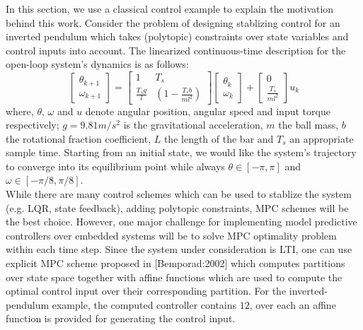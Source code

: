 In this section, we use a classical control example to explain the motivation behind this work. Consider the problem of designing stablizing control for an inverted pendulum which takes (polytopic) constraints over state variables and control inputs into account. The linearized continuous-time description for the open-loop system's dynamics is as follows:
	\begin{equation}
		\begin{bmatrix}
			 \theta_{k+1}\\
			\omega_{k+1}
		\end{bmatrix}=
		\begin{bmatrix}
			1 & T_s\\
			\frac{T_sg}{l}& (1-\frac{T_sb}{ml^2})		
		\end{bmatrix}
		\begin{bmatrix}
			\theta_k\\
			\omega_k
		\end{bmatrix}+
		\begin{bmatrix}
			0\\
			\frac{T_s}{ml^2}
		\end{bmatrix}u_k
		\label{eq:pendul_ss}
	\end{equation}
	where, $\theta$, $\omega$ and $u$ denote angular position, angular speed and input torque respectively; $g=9.81 m/s^2$ is the gravitational acceleration, $m$ the ball mass, $b$ the rotational fraction coefficient, $L$ the length of the bar and $T_s$ an appropriate sample time. Starting from an initial state, we would like the system's trajectory to converge into its equilibrium point while always $\theta\in[-\pi,\pi]$ and $\omega\in[-\pi/8,\pi/8]$. \\
	While there are many control schemes which can be used to stablize the system (e.g. LQR, state feedback), adding polytopic constraints, MPC schemes will be the best choice. 
	However, one major challenge for implementing model predictive controllers over embedded systems will be to solve MPC optimality problem within each time step. Since the system under consideration is LTI, one can use explicit MPC scheme proposed in [Bemporad:2002] which computes partitions over state space together with affine functions which are used to compute the optimal control input over their corresponding partition. For the inverted-pendulum example, the computed controller contains $12$, over each an affine function is provided for generating the control input.\\
